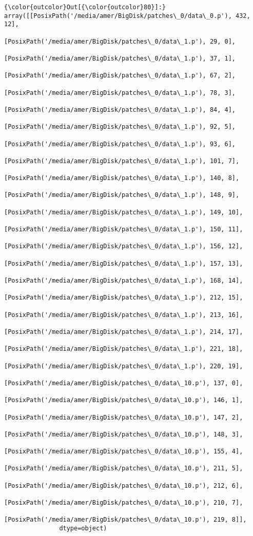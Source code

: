 \documentclass[11pt]{article}
\begin{document}
\begin{Verbatim}[commandchars=\\\{\}]
{\color{outcolor}Out[{\color{outcolor}80}]:} array([[PosixPath('/media/amer/BigDisk/patches\_0/data\_0.p'), 432, 12],
                [PosixPath('/media/amer/BigDisk/patches\_0/data\_1.p'), 29, 0],
                [PosixPath('/media/amer/BigDisk/patches\_0/data\_1.p'), 37, 1],
                [PosixPath('/media/amer/BigDisk/patches\_0/data\_1.p'), 67, 2],
                [PosixPath('/media/amer/BigDisk/patches\_0/data\_1.p'), 78, 3],
                [PosixPath('/media/amer/BigDisk/patches\_0/data\_1.p'), 84, 4],
                [PosixPath('/media/amer/BigDisk/patches\_0/data\_1.p'), 92, 5],
                [PosixPath('/media/amer/BigDisk/patches\_0/data\_1.p'), 93, 6],
                [PosixPath('/media/amer/BigDisk/patches\_0/data\_1.p'), 101, 7],
                [PosixPath('/media/amer/BigDisk/patches\_0/data\_1.p'), 140, 8],
                [PosixPath('/media/amer/BigDisk/patches\_0/data\_1.p'), 148, 9],
                [PosixPath('/media/amer/BigDisk/patches\_0/data\_1.p'), 149, 10],
                [PosixPath('/media/amer/BigDisk/patches\_0/data\_1.p'), 150, 11],
                [PosixPath('/media/amer/BigDisk/patches\_0/data\_1.p'), 156, 12],
                [PosixPath('/media/amer/BigDisk/patches\_0/data\_1.p'), 157, 13],
                [PosixPath('/media/amer/BigDisk/patches\_0/data\_1.p'), 168, 14],
                [PosixPath('/media/amer/BigDisk/patches\_0/data\_1.p'), 212, 15],
                [PosixPath('/media/amer/BigDisk/patches\_0/data\_1.p'), 213, 16],
                [PosixPath('/media/amer/BigDisk/patches\_0/data\_1.p'), 214, 17],
                [PosixPath('/media/amer/BigDisk/patches\_0/data\_1.p'), 221, 18],
                [PosixPath('/media/amer/BigDisk/patches\_0/data\_1.p'), 220, 19],
                [PosixPath('/media/amer/BigDisk/patches\_0/data\_10.p'), 137, 0],
                [PosixPath('/media/amer/BigDisk/patches\_0/data\_10.p'), 146, 1],
                [PosixPath('/media/amer/BigDisk/patches\_0/data\_10.p'), 147, 2],
                [PosixPath('/media/amer/BigDisk/patches\_0/data\_10.p'), 148, 3],
                [PosixPath('/media/amer/BigDisk/patches\_0/data\_10.p'), 155, 4],
                [PosixPath('/media/amer/BigDisk/patches\_0/data\_10.p'), 211, 5],
                [PosixPath('/media/amer/BigDisk/patches\_0/data\_10.p'), 212, 6],
                [PosixPath('/media/amer/BigDisk/patches\_0/data\_10.p'), 210, 7],
                [PosixPath('/media/amer/BigDisk/patches\_0/data\_10.p'), 219, 8]],
               dtype=object)
\end{Verbatim}
            
\end{document}
